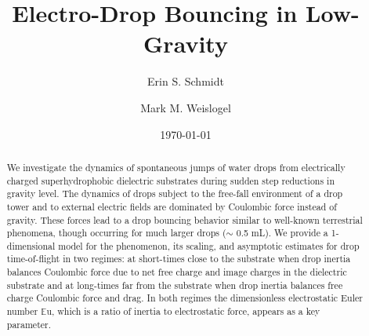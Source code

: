 \documentclass[aip,reprint, floatfix]{revtex4-1}
\begin{document}
\newcommand{\redline}{\raisebox{2pt}{\tikz{\draw[-,red,solid,line width = 1.5pt](0,0) -- (5mm,0);}}}
\graphicspath{ {../figures/} }

\newcommand{\blueline}{\raisebox{2pt}{\tikz{\draw[-,blue,solid,line width = 1.5pt](0,0) -- (5mm,0);}}}
\graphicspath{ {../figures/} }

\newcommand{\cyanline}{\raisebox{2pt}{\tikz{\draw[-,cyan,solid,line width = 1.5pt](0,0) -- (5mm,0);}}}
\graphicspath{ {../figures/} }


\title{Electro-Drop Bouncing in Low-Gravity} %



\author{Erin S. Schmidt}

\author{Mark M. Weislogel}


\date{\today}

\begin{abstract}

We investigate the dynamics of spontaneous jumps of water drops from electrically charged superhydrophobic dielectric substrates during sudden step reductions in gravity level. The dynamics of drops subject to the free-fall environment of a drop tower and to external electric fields are dominated by Coulombic force instead of gravity. These forces lead to a drop bouncing behavior similar to well-known terrestrial phenomena, though occurring for much larger drops ($\sim$ 0.5 mL). We provide a 1-dimensional model for the phenomenon, its scaling, and asymptotic estimates for drop time-of-flight in two regimes: at short-times close to the substrate when drop inertia balances Coulombic force due to net free charge and image charges in the dielectric substrate and at long-times far from the substrate when drop inertia balances free charge Coulombic force and drag. In both regimes the dimensionless electrostatic Euler number $\mathbb{E}\mbox{u}$, which is a ratio of inertia to electrostatic force, appears as a key parameter.
\end{abstract}
\end{document}
